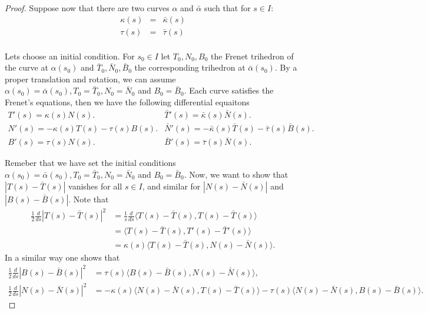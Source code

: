 \documentclass{amsart}
\begin{document}
\begin{proof}
Suppose now that there are two curves \(\alpha\) and \(\bar{\alpha}\) such that for \(s\in I\):
\begin{equation*}
\begin{split}
\kappa(s)& =& \bar{\kappa}(s)\\
\tau(s)& =& \bar{\tau}(s)\\
\end{split}
\end{equation*}

Lets choose an initial condition. For \(s_0\in I\) let \(T_0,N_0,B_0\) the Frenet trihedron of the curve at \(\alpha(s_0)\) and \(\bar{T}_0,\bar{N}_0,\bar{B}_0\) the corresponding trihedron at \(\bar{\alpha}(s_0)\). By a proper translation and rotation, we can assume
\(\alpha(s_0) = \bar{\alpha}(s_0), T_0 = \bar{T}_0, N_0 = \bar{N}_0\) and \(B_0 = \bar{B}_0\). Each curve satisfies the Frenet's equations, then we have the following differential equaitons
\begin{equation*}
\begin{array}{ll}
T'(s) = \kappa(s) N(s). & \bar{T}'(s) = \bar{\kappa}(s) \bar{N}(s).\\
N'(s) = -\kappa(s) T(s) - \tau(s) B(s). &  \bar{N}'(s) = -\bar{\kappa}(s) \bar{T}(s) - \bar{\tau}(s) \bar{B}(s).\\
B'(s) = \tau(s) N(s) . & \bar{B}'(s) = \bar{\tau}(s) \bar{N}(s) .
\end{array}
\end{equation*}

Remeber that we have set the initial conditions \(\alpha(s_0) = \bar{\alpha}(s_0), T_0 = \bar{T}_0, N_0 = \bar{N}_0\) and \(B_0 = \bar{B}_0\).
Now, we want to show that \(|T(s) - \bar{T}(s)|\) vanishes for all \(s\in I\), and similar for \(|N(s) - \bar{N}(s)|\) and \(|B(s) - \bar{B}(s)|\). Note that
\begin{align*}
 \frac{1}{2}\frac{d}{ds} |T(s) - \bar{T}(s)|^2 & = \frac{1}{s}\frac{d}{ds} \langle T(s) - \bar{T}(s), T(s) - \bar{T}(s) \rangle \\ 
& = \langle T(s) - \bar{T}(s), T'(s) - \bar{T}'(s) \rangle \\
& = \kappa(s) \langle T(s) - \bar{T}(s), N(s) - \bar{N}(s) \rangle.
\end{align*}
In a similar way one shows that
\begin{align*}
\frac{1}{2}\frac{d}{ds} |B(s) - \bar{B}(s)|^2 &= \tau(s) \langle B(s) - \bar{B}(s), N(s) - \bar{N}(s) \rangle, \\
\frac{1}{2}\frac{d}{ds} |N(s) - \bar{N}(s)|^2 &= -\kappa(s) \langle N(s) - \bar{N}(s), T(s) - \bar{T}(s) \rangle  -\tau(s) \langle N(s) - \bar{N}(s), B(s) - \bar{B}(s) \rangle.
\end{align*}


\end{proof}
\end{document}
